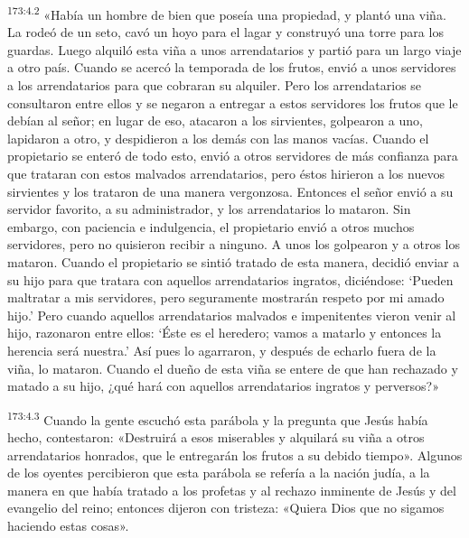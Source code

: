 \par 
\textsuperscript{173:4.2} «Había un hombre de bien que poseía una propiedad, y plantó una viña. La rodeó de un seto, cavó un hoyo para el lagar y construyó una torre para los guardas. Luego alquiló esta viña a unos arrendatarios y partió para un largo viaje a otro país. Cuando se acercó la temporada de los frutos, envió a unos servidores a los arrendatarios para que cobraran su alquiler. Pero los arrendatarios se consultaron entre ellos y se negaron a entregar a estos servidores los frutos que le debían al señor; en lugar de eso, atacaron a los sirvientes, golpearon a uno, lapidaron a otro, y despidieron a los demás con las manos vacías. Cuando el propietario se enteró de todo esto, envió a otros servidores de más confianza para que trataran con estos malvados arrendatarios, pero éstos hirieron a los nuevos sirvientes y los trataron de una manera vergonzosa. Entonces el señor envió a su servidor favorito, a su administrador, y los arrendatarios lo mataron. Sin embargo, con paciencia e indulgencia, el propietario envió a otros muchos servidores, pero no quisieron recibir a ninguno. A unos los golpearon y a otros los mataron. Cuando el propietario se sintió tratado de esta manera, decidió enviar a su hijo para que tratara con aquellos arrendatarios ingratos, diciéndose: `Pueden maltratar a mis servidores, pero seguramente mostrarán respeto por mi amado hijo.' Pero cuando aquellos arrendatarios malvados e impenitentes vieron venir al hijo, razonaron entre ellos: `Éste es el heredero; vamos a matarlo y entonces la herencia será nuestra.' Así pues lo agarraron, y después de echarlo fuera de la viña, lo mataron. Cuando el dueño de esta viña se entere de que han rechazado y matado a su hijo, ¿qué hará con aquellos arrendatarios ingratos y perversos?»

\par 
\textsuperscript{173:4.3} Cuando la gente escuchó esta parábola y la pregunta que Jesús había hecho, contestaron: «Destruirá a esos miserables y alquilará su viña a otros arrendatarios honrados, que le entregarán los frutos a su debido tiempo». Algunos de los oyentes percibieron que esta parábola se refería a la nación judía, a la manera en que había tratado a los profetas y al rechazo inminente de Jesús y del evangelio del reino; entonces dijeron con tristeza: «Quiera Dios que no sigamos haciendo estas cosas».

